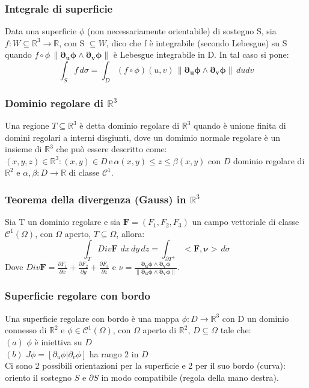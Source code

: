 \documentclass{article} %
\begin{document}
    \subsubsection*{Integrale di superficie}
    Data una superficie $\phi$ (non necessariamente orientabile) di sostegno S, sia $f: W \subseteq \mathbb{R}^3 \to \mathbb{R}$, con S $\subseteq W$, dico che f è integrabile (secondo Lebesgue) su S quando $f \circ \phi \, \lVert \mathbf{ \partial_u \phi \wedge \partial_v \phi} \rVert$ è Lebesgue integrabile in D. In tal caso si pone: 
    $$\int_S f \, d \sigma = \int_D (f \circ \phi) (u,v) \, \lVert \mathbf{ \partial_u \phi \wedge \partial_v \phi} \rVert \, du dv $$

    \subsubsection*{Dominio regolare di $\mathbb{R}^3$}
    Una regione $T \subseteq \mathbb{R}^3$ è detta dominio regolare di $\mathbb{R}^3$ quando è unione finita di domini regolari a interni disgiunti, dove un domimio normale regolare è un insieme di $\mathbb{R}^3$ che può essere descritto come: \\
    ${(x,y,z) \in \mathbb{R}^3 : (x,y) \in D \, \text{e} \, \alpha(x,y) \leq z \leq \beta(x,y)}$ con $D$ dominio regolare di $\mathbb{R}^2$ e $\alpha, \beta: D \to \mathbb{R}$ di classe $\mathcal{C}^1$. 

    \subsubsection*{Teorema della divergenza (Gauss) in $\mathbb{R}^3$}
    Sia T un dominio regolare e sia $\mathbf{F}=(F_1, F_2, F_3)$ un campo vettoriale di classe $\mathcal{C}^1(\Omega)$, con $\Omega$ aperto, $T \subseteq \Omega$, allora:
    $$\int_T Div \mathbf{F} \,\, dx \, dy \, dz = \int_{\partial T^+} <\mathbf{F}, \mathbf{\nu}> \, d\sigma$$
    Dove $ Div \mathbf{F} = \frac{\partial F_1}{\partial x} + \frac{\partial F_2}{\partial y} + \frac{\partial F_3}{\partial z}$ e $\nu = \frac{ \mathbf{ \partial_u \phi \wedge \partial_v \phi}}{\lVert \mathbf{ \partial_u \phi \wedge \partial_v \phi} \rVert}$.

    \subsubsection*{Superficie regolare con bordo}
    Una superficie regolare con bordo è una mappa $\phi:D \to \mathbb{R}^3$ con D un dominio connesso di $\mathbb{R}^2$ e $\phi \in \mathcal{C}^1 (\Omega)$, con $\Omega$ aperto di $\mathbb{R}^2$, $D \subseteq \Omega$ tale che: \\
    $(a)$ $\phi$ è iniettiva su $D$ \\
    $(b)$ $J \phi = \left[ \partial_u \phi | \partial_v \phi \right]$ ha rango 2 in $D$ \\
    Ci sono 2 possibili orientazioni per la superficie e 2 per il suo bordo (curva): oriento il sostegno $S$ e $\partial S$ in modo compatibile (regola della mano destra).
\end{document}
